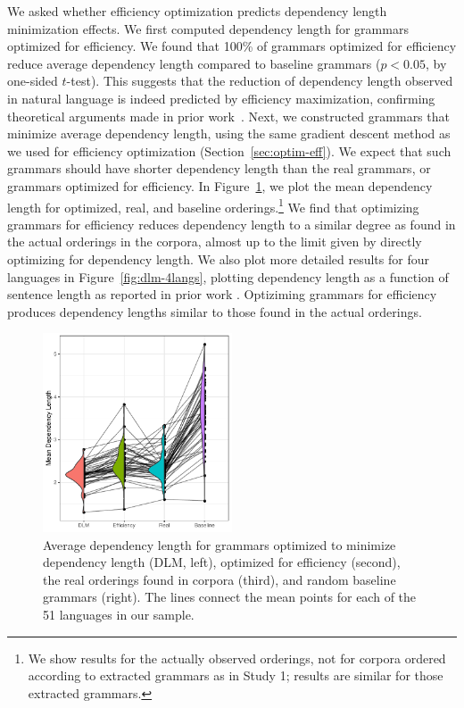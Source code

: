 \documentclass[10pt,twoside,lineno]{article}
\begin{document}
We asked whether efficiency optimization predicts dependency length minimization effects.
We first computed dependency length for grammars optimized for efficiency.
We found that 100\% of grammars optimized for efficiency reduce average dependency length compared to baseline grammars ($p < 0.05$, by one-sided $t$-test). 
This suggests that the reduction of dependency length observed in natural language is indeed predicted by efficiency maximization, confirming theoretical arguments made in prior work~\cite{hawkins1994performance,hawkins2004efficiency,futrell2017memory, futrell2017generalizing}.
Next, we constructed grammars that minimize average dependency length, using the same gradient descent method as we used for efficiency optimization (Section~\ref{sec:optim-eff}).
We expect that such grammars should have shorter dependency length than the real grammars, or grammars optimized for efficiency.
In Figure~\ref{fig:dlm-avg}, we plot the mean dependency length for optimized, real, and baseline orderings.\footnote{We show results for the actually observed orderings, not for corpora ordered according to extracted grammars as in Study 1; results are similar for those extracted grammars.} 
We find that optimizing grammars for efficiency reduces dependency length to a similar degree as found in the actual orderings in the corpora, almost up to the limit given by directly optimizing for dependency length. 
We also plot more detailed results for four languages in Figure~\ref{fig:dlm-4langs}, plotting dependency length as a function of sentence length as reported in prior work \cite{ferrericancho2014risks,futrell2015largescale}.
Optiziming grammars for efficiency produces dependency lengths similar to those found in the actual orderings.


\begin{figure}[ht]
    \centering
     \includegraphics[width=0.5\textwidth]{depl-violin-all-1.png} 
        \caption{Average dependency length for grammars optimized to minimize dependency length (DLM, left), optimized for efficiency (second), the real orderings found in corpora (third), and random baseline grammars (right). The lines connect the mean points for each of the 51 languages in our sample.}
    \label{fig:dlm-avg}
\end{figure}
\end{document}
